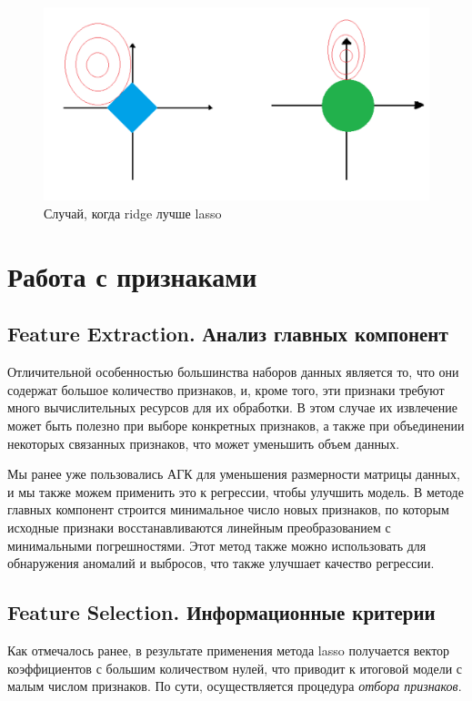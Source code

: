 \documentclass[12pt]{article}
\begin{document}
		
	\begin{figure}[h!]
		\includegraphics[width=\linewidth]{img/2}
		\caption{Случай, когда ridge лучше lasso}
		\label{2}
	\end{figure}
	
	\section{Работа с признаками}
	
	\subsection{Feature Extraction. Анализ главных компонент}
	
	Отличительной особенностью большинства наборов данных является то, что они содержат большое количество признаков, и, кроме того, эти признаки требуют много вычислительных ресурсов для их обработки. В этом случае их извлечение может быть полезно при выборе конкретных признаков, а также при объединении некоторых связанных признаков, что может уменьшить объем данных.
	
	Мы ранее уже пользовались АГК для уменьшения размерности матрицы данных, и мы также можем применить это к регрессии, чтобы улучшить модель. В методе главных компонент строится минимальное число новых признаков, по которым исходные признаки восстанавливаются линейным преобразованием с минимальными погрешностями. Этот метод также можно использовать для обнаружения аномалий и выбросов, что также улучшает качество регрессии.
	
	\subsection{Feature Selection. Информационные критерии}
	
	Как отмечалось ранее, в результате применения метода lasso получается вектор коэффициентов с большим количеством нулей, что приводит к итоговой модели с малым числом признаков. По сути, осуществляется процедура \textit{отбора признаков}.
	
\end{document}
